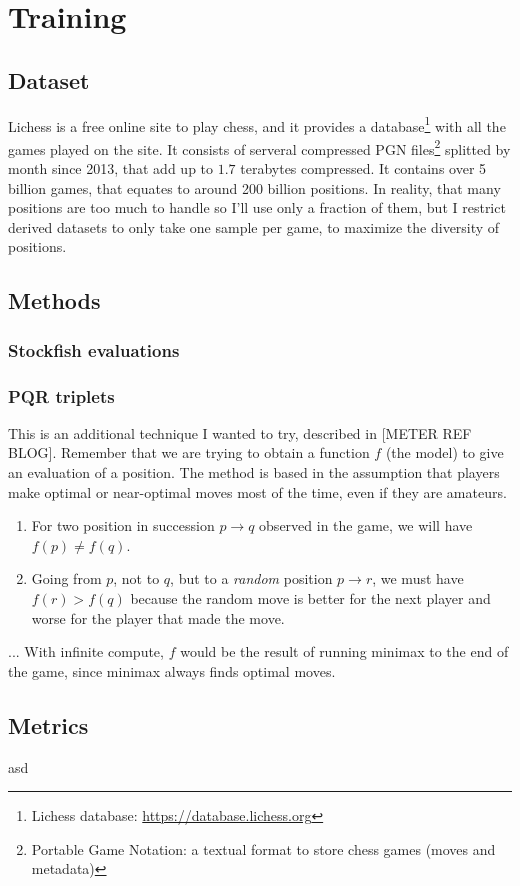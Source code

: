 
\section{Training}

\subsection{Dataset}

Lichess is a free online site to play chess, and it provides a database\footnote[1]{Lichess database: \url{https://database.lichess.org}} with all the games played on the site. It consists of serveral compressed PGN files\footnote[2]{Portable Game Notation: a textual format to store chess games (moves and metadata)} splitted by month since 2013, that add up to $1.7$ terabytes compressed. It contains over 5 billion games, that equates to around 200 billion positions. In reality, that many positions are too much to handle so I'll use only a fraction of them, but I restrict derived datasets to only take one sample per game, to maximize the diversity of positions.


\subsection{Methods}



\subsubsection{Stockfish evaluations}


\subsubsection{PQR triplets}

This is an additional technique I wanted to try, described in [METER REF BLOG]. Remember that we are trying to obtain a function $f$ (the model) to give an evaluation of a position. The method is based in the assumption that players make optimal or near-optimal moves most of the time, even if they are amateurs.

\begin{enumerate}
\item For two position in succession $p \rightarrow q$  observed in the game, we will have $f(p) \neq f(q)$.
\item Going from $p$, not to $q$, but to a \textit{random} position $p \rightarrow r$, we must have $f(r) > f(q)$ because the random move is better for the next player and worse for the player that made the move.
\end{enumerate}


... With infinite compute, $f$ would be the result of running minimax to the end of the game, since minimax always finds optimal moves.

\subsection{Metrics}

asd \cite{nnue:2018}
